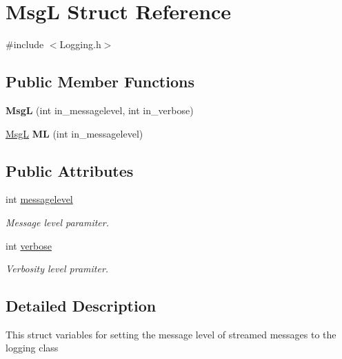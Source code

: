 \hypertarget{structMsgL}{\section{Msg\-L Struct Reference}
\label{structMsgL}
}


{\ttfamily \#include $<$Logging.\-h$>$}

\subsection*{Public Member Functions}
\begin{DoxyCompactItemize}
\item 
\hypertarget{structMsgL_a3db55b36647db334baef366d0be0730c}{{\bfseries Msg\-L} (int in\-\_\-messagelevel, int in\-\_\-verbose)}\label{structMsgL_a3db55b36647db334baef366d0be0730c}

\item 
\hypertarget{structMsgL_afcb7738a46b98d647fc81937af7d0a49}{\hyperlink{structMsgL}{Msg\-L} {\bfseries M\-L} (int in\-\_\-messagelevel)}\label{structMsgL_afcb7738a46b98d647fc81937af7d0a49}

\end{DoxyCompactItemize}
\subsection*{Public Attributes}
\begin{DoxyCompactItemize}
\item 
\hypertarget{structMsgL_a5372c9de7067078f88eda46bcec43096}{int \hyperlink{structMsgL_a5372c9de7067078f88eda46bcec43096}{messagelevel}}\label{structMsgL_a5372c9de7067078f88eda46bcec43096}

\begin{DoxyCompactList}\small\item\em Message level paramiter. \end{DoxyCompactList}\item 
\hypertarget{structMsgL_a10337c60eff6573f6bf36dd6b6bfd4c6}{int \hyperlink{structMsgL_a10337c60eff6573f6bf36dd6b6bfd4c6}{verbose}}\label{structMsgL_a10337c60eff6573f6bf36dd6b6bfd4c6}

\begin{DoxyCompactList}\small\item\em Verbosity level pramiter. \end{DoxyCompactList}\end{DoxyCompactItemize}


\subsection{Detailed Description}
This struct variables for setting the message level of streamed messages to the logging class

